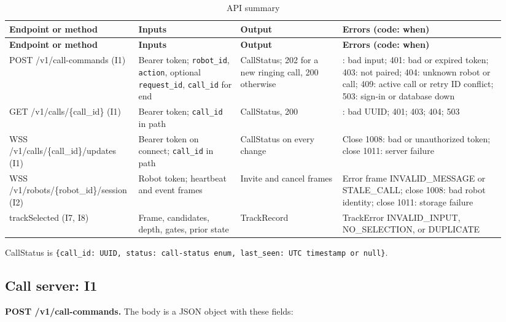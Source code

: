 \documentclass[12pt,letterpaper]{article}
\newcommand{\field}[1]{\texttt{#1}}
\begin{document}
\begingroup\small
\setlength{\tabcolsep}{4pt}
\begin{longtable}{@{}>{\RaggedRight\arraybackslash}p{0.22\linewidth}>{\RaggedRight\arraybackslash}p{0.2\linewidth}>{\RaggedRight\arraybackslash}p{0.2\linewidth}>{\RaggedRight\arraybackslash}p{0.32\linewidth}@{}}
\caption{API summary}\\
\toprule\textbf{Endpoint or method} & \textbf{Inputs} & \textbf{Output} & \textbf{Errors (code: when)}\\\midrule\endfirsthead
\toprule\textbf{Endpoint or method} & \textbf{Inputs} & \textbf{Output} & \textbf{Errors (code: when)}\\\midrule\endhead
\midrule\endfoot\bottomrule\endlastfoot
POST /v1/\allowbreak call-commands (I1) & Bearer token; \field{robot\_id}, \field{action}, optional \field{request\_id}, \field{call\_id} for end & CallStatus; 202 for a new ringing call, 200 otherwise & 400: bad input; 401: bad or expired token; 403: not paired; 404: unknown robot or call; 409: active call or retry ID conflict; 503: sign-in or database down \\
GET /v1/\allowbreak calls/\allowbreak\{call\_id\} (I1) & Bearer token; \field{call\_id} in path & CallStatus, 200 & 400: bad UUID; 401; 403; 404; 503 \\
WSS /v1/\allowbreak calls/\allowbreak\{call\_id\}/\allowbreak updates (I1) & Bearer token on connect; \field{call\_id} in path & CallStatus on every change & Close 1008: bad or unauthorized token; close 1011: server failure \\
WSS /v1/\allowbreak robots/\allowbreak\{robot\_id\}/\allowbreak session (I2) & Robot token; heartbeat and event frames & Invite and cancel frames & Error frame INVALID\_MESSAGE or STALE\_CALL; close 1008: bad robot identity; close 1011: storage failure \\
trackSelected (I7, I8) & Frame, candidates, depth, gates, prior state & TrackRecord & TrackError INVALID\_INPUT, NO\_SELECTION, or DUPLICATE \\
\end{longtable}
\endgroup

CallStatus is \field{\{call\_id: UUID, status: call-status enum, last\_seen: UTC timestamp or null\}}.

\subsection*{Call server: I1}

\textbf{POST /v1/call-commands.} The body is a JSON object with these fields:
\end{document}
